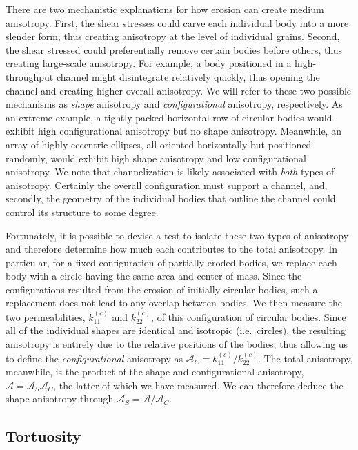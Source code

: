 \documentclass[3p]{elsarticle}
\newcommand{\anis}{\mathcal{A}}
\begin{document}
There are two mechanistic explanations for how erosion can create medium anisotropy. First, the shear stresses could carve each individual body into a more slender form, thus creating anisotropy at the level of individual grains. Second, the shear stressed could preferentially remove certain bodies before others, thus creating large-scale anisotropy. For example, a body positioned in a high-throughput channel might disintegrate relatively quickly, thus opening the channel and creating higher overall anisotropy. We will refer to these two possible mechanisms as {\em shape} anisotropy and {\em configurational} anisotropy, respectively. As an extreme example, a tightly-packed horizontal row of circular bodies would exhibit high configurational anisotropy but no shape anisotropy. Meanwhile, an array of highly eccentric ellipses, all oriented horizontally but positioned randomly, would exhibit high shape anisotropy and low configurational anisotropy. We note that channelization is likely associated with {\em both} types of anisotropy. Certainly the overall configuration must support a channel, and, secondly, the geometry of the individual bodies that outline the channel could control its structure to some degree.

Fortunately, it is possible to devise a test to isolate these two types of anisotropy and therefore determine how much each contributes to the total anisotropy. In particular, for a fixed configuration of partially-eroded bodies, we replace each body with a circle having the same area and center of mass. Since the configurations resulted from the erosion of initially circular bodies, such a replacement does not lead to any overlap between bodies. We then measure the two permeabilities, $k_{11}^{(c)}$ and $ k_{22}^{(c)}$, of this configuration of circular bodies. Since all of the individual shapes are identical and isotropic (i.e.~circles), the resulting anisotropy is entirely due to the relative positions of the bodies, thus allowing us to define the {\em configurational} anisotropy as $\anis_C = k_{11}^{(c)} / k_{22}^{(c)}$. The total anisotropy, meanwhile, is the product of the shape and configurational anisotropy, $\anis = \anis_S \anis_C$, the latter of which we have measured. We can therefore deduce the shape anisotropy through $\anis_S = \anis/\anis_C$.

\subsection{Tortuosity}
\end{document}
